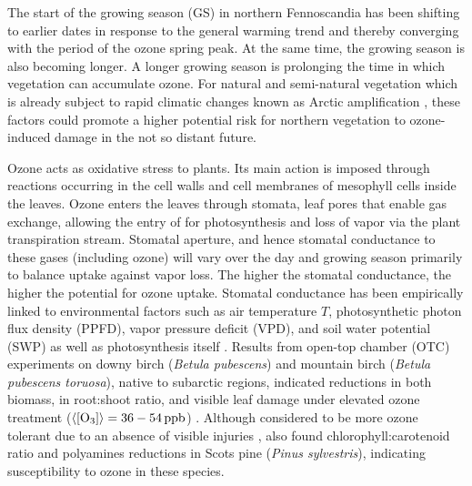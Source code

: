 \documentclass[bg, manuscript]{copernicus}
\begin{document}
The start of the growing season (GS) in northern Fennoscandia has been shifting to earlier dates in response to the general warming trend \citep[e.g.]{GCB:Menzel2006,RS:Hogda2013,IJB:Karlsen2007} and thereby converging with the period of the ozone spring peak. At the same time, the growing season is also becoming longer. A longer growing season is prolonging the time in which vegetation can accumulate ozone. For natural and semi-natural vegetation which is already subject to rapid climatic changes known as Arctic amplification \citep{AMAP2012,IPCC2013}, these factors could promote a higher potential risk for northern vegetation to ozone-induced damage in the not so distant future.

Ozone acts as oxidative stress to plants. Its main action is imposed through reactions occurring in the cell walls and cell membranes of mesophyll cells inside the leaves. Ozone enters the leaves through stomata, leaf pores that enable gas exchange, allowing the entry of  for photosynthesis and loss of  vapor via the plant transpiration stream. Stomatal aperture, and hence stomatal conductance to these gases (including ozone) will vary over the day and growing season primarily to balance  uptake against  vapor loss. The higher the stomatal conductance, the higher the potential for ozone uptake. Stomatal conductance has been empirically linked to environmental factors such as air temperature $T$, photosynthetic photon flux density (PPFD), vapor pressure deficit (VPD), and soil water potential (SWP) as well as photosynthesis itself \cite[e.g.]{PTRS:Jarvis1976, BallBerry1987, Emberson2000, ICP:MappingManual2017}. Results from open-top chamber (OTC) experiments on downy birch (\emph{Betula pubescens}) and mountain birch (\emph{Betula pubescens toruosa}), native to subarctic regions, indicated reductions in both biomass, in root:shoot ratio, and visible leaf damage under elevated ozone treatment ($\left<\chem{[O_3]}\right> = 36-54\,\unit{ppb}$) \citep{Amb:Manninen2009}. Although considered to be more ozone tolerant due to an absence of visible injuries \citep{Amb:Girgzdiene2009}, \citet{Amb:Manninen2009} also found chlorophyll:carotenoid ratio and polyamines reductions in Scots pine (\emph{Pinus sylvestris}), indicating susceptibility to ozone in these species.\\
\end{document}
